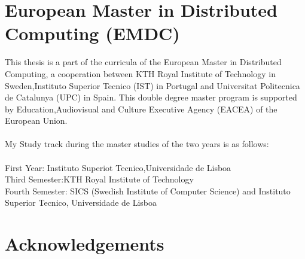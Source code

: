 \newpage

\chapter*{European Master in Distributed Computing (EMDC)  }

This thesis is a part of the curricula of the European Master in Distributed Computing, a cooperation between KTH Royal Institute of Technology in Sweden,Instituto Superior Tecnico (IST)  in Portugal and Universitat Politecnica de Catalunya (UPC)  in Spain. This double degree master program is supported by Education,Audiovisual and Culture Executive Agency (EACEA)  of the European Union.\\\\
My Study track during the master studies of the two years is as follows:\\\\
First Year: Instituto Superiot Tecnico,Universidade de Lisboa\\
Third Semester:KTH Royal Institute of Technology\\
Fourth Semester: SICS (Swedish Institute of Computer Science)  and Instituto Superior Tecnico, Universidade de Lisboa


\chapter*{Acknowledgements}
\thispagestyle{empty}

